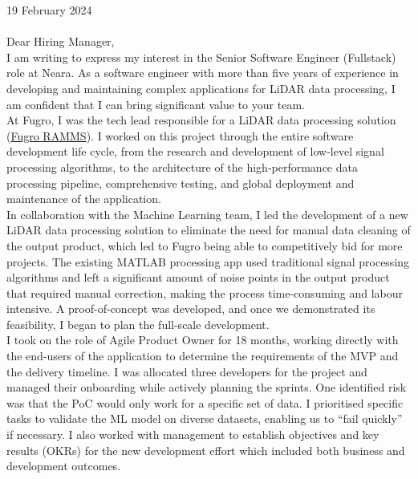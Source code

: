 \vspace{30pt}

19 February 2024 \\ \\

Dear Hiring Manager, \\

I am writing to express my interest in the Senior Software Engineer (Fullstack) role at Neara. As a software engineer with more than five years of experience in developing and maintaining complex applications for LiDAR data processing, I am confident that I can bring significant value to your team. \\

At Fugro, I was the tech lead responsible for a LiDAR data processing solution (\href{https://www.youtube.com/watch?v=f65bdm4tous}{\underline{Fugro RAMMS}}). I worked on this project through the entire software development life cycle, from the research and development of low-level signal processing algorithms, to the architecture of the high-performance data processing pipeline, comprehensive testing, and global deployment and maintenance of the application. \\

In collaboration with the Machine Learning team, I led the development of a new LiDAR data processing solution to eliminate the need for manual data cleaning of the output product, which led to Fugro being able to competitively bid for more projects. The existing MATLAB processing app used traditional signal processing algorithms and left a significant amount of noise points in the output product that required manual correction, making the process time-consuming and labour intensive. A proof-of-concept was developed, and once we demonstrated its feasibility, I began to plan the full-scale development. \\

I took on the role of Agile Product Owner for 18 months, working directly with the end-users of the application to determine the requirements of the MVP and the delivery timeline. I was allocated three developers for the project and managed their onboarding while actively planning the sprints. One identified risk was that the PoC would only work for a specific set of data. I prioritised specific tasks to validate the ML model on diverse datasets, enabling us to “fail quickly” if necessary. I also worked with management to establish objectives and key results (OKRs) for the new development effort which included both business and development outcomes.  \\


